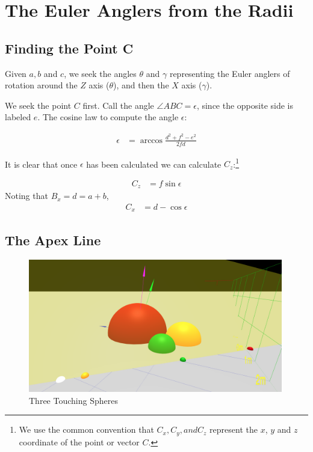 \documentclass{article}
\begin{document}
\section{The Euler Anglers from the Radii}

\subsection{Finding the Point C}

Given $a,b$ and $c$, we seek the angles $\theta$ and $\gamma$ representing
the Euler anglers of rotation around the $Z$ axis ($\theta$), and then the $X$ axis ($\gamma$).

We seek the  point $C$ first.
Call the angle $\angle ABC = \epsilon$, since the opposite side
is labeled $e$.
The cosine law to compute the angle $\epsilon$:

\begin{align}
  \epsilon  &= \arccos{\frac{d^2 + f^2 - e^2}{2fd}}
\end{align}

It is clear that once $\epsilon$ has been calculated
we can calculate $C_z$:\footnote{We use the common convention that $C_x, C_y, and C_z$ represent the $x$, $y$ and $z$
coordinate of the point or vector $C$.}

\begin{align}
 C_z  &= f\sin{\epsilon}
\end{align}
Noting that $B_x = d = a + b$,
\begin{align}
  C_x   &= d - \cos{\epsilon}
\end{align}


\subsection{The Apex Line}

\begin{figure}
     \centering
     \includegraphics[width=0.99\textwidth]{figures/StandardThreeSphereDiagram.png}
     \caption{Three Touching Spheres}
  \label{fig:fixed}
\end{figure}
\end{document}
